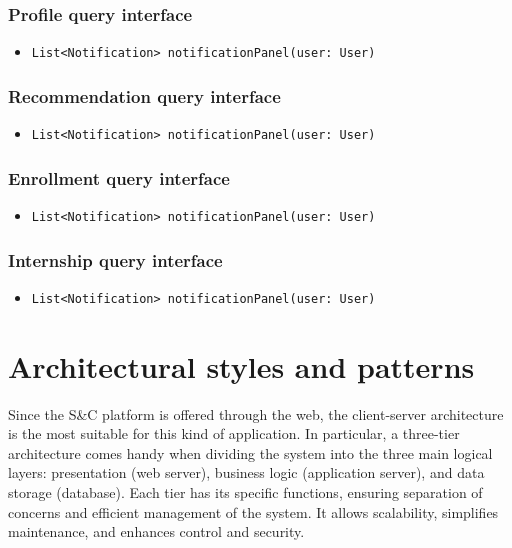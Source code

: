 \subsubsection{Profile query interface}
\begin{itemize}
    \item \verb|List<Notification> notificationPanel(user: User)|
\end{itemize}

\subsubsection{Recommendation query interface}
\begin{itemize}
    \item \verb|List<Notification> notificationPanel(user: User)|
\end{itemize}

\subsubsection{Enrollment query interface}
\begin{itemize}
    \item \verb|List<Notification> notificationPanel(user: User)|
\end{itemize}

\subsubsection{Internship query interface}
\begin{itemize}
    \item \verb|List<Notification> notificationPanel(user: User)|
\end{itemize}

\section{Architectural styles and patterns}

Since the S\&C platform is offered through the web, the client-server architecture is the most suitable for this kind of application.
In particular, a three-tier architecture comes handy when dividing the system into the three main logical layers: presentation (web server), business logic (application server), and data storage (database).
Each tier has its specific functions, ensuring separation of concerns and efficient management of the system.
It allows scalability, simplifies maintenance, and enhances control and security.

